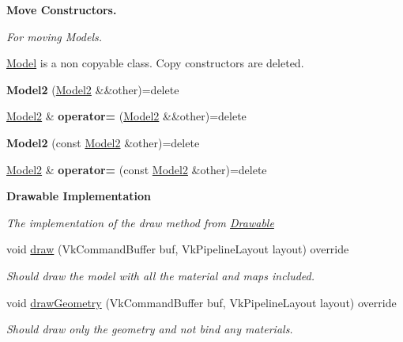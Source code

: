 \begin{Indent}\textbf{ Move Constructors.}\par
{\em For moving Models.

\hyperlink{classblaze_1_1Model}{Model} is a non copyable class. Copy constructors are deleted. }\begin{DoxyCompactItemize}
\item 
\mbox{\label{classblaze_1_1Model2_a3483ac3041c9df6e6aae1482d7469f7e}} 
{\bfseries Model2} (\hyperlink{classblaze_1_1Model2}{Model2} \&\&other)=delete
\item 
\mbox{\label{classblaze_1_1Model2_a9cf8f52140f0e7e3214165bfc3ed1b30}} 
\hyperlink{classblaze_1_1Model2}{Model2} \& {\bfseries operator=} (\hyperlink{classblaze_1_1Model2}{Model2} \&\&other)=delete
\item 
\mbox{\label{classblaze_1_1Model2_af6f3dcda9570994cb0f6450e913e7fd3}} 
{\bfseries Model2} (const \hyperlink{classblaze_1_1Model2}{Model2} \&other)=delete
\item 
\mbox{\label{classblaze_1_1Model2_a07de3972eae0054bc18eb5eec76ee789}} 
\hyperlink{classblaze_1_1Model2}{Model2} \& {\bfseries operator=} (const \hyperlink{classblaze_1_1Model2}{Model2} \&other)=delete
\end{DoxyCompactItemize}
\end{Indent}
\begin{Indent}\textbf{ Drawable Implementation}\par
{\em The implementation of the draw method from \hyperlink{classblaze_1_1Drawable}{Drawable} }\begin{DoxyCompactItemize}
\item 
void \hyperlink{classblaze_1_1Model2_a82bab7e2bed8bbbbff8f9c250785281d}{draw} (Vk\+Command\+Buffer buf, Vk\+Pipeline\+Layout layout) override
\begin{DoxyCompactList}\small\item\em Should draw the model with all the material and maps included. \end{DoxyCompactList}\item 
void \hyperlink{classblaze_1_1Model2_aadf59268e6faa861e27d6995a63552c3}{draw\+Geometry} (Vk\+Command\+Buffer buf, Vk\+Pipeline\+Layout layout) override
\begin{DoxyCompactList}\small\item\em Should draw only the geometry and not bind any materials. \end{DoxyCompactList}\end{DoxyCompactItemize}
\end{Indent}

